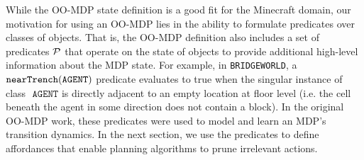 \documentclass[]{article}
\begin{document}
While the OO-MDP state definition is a good fit for the Minecraft
domain, our motivation for using an OO-MDP lies in the ability to
formulate predicates over classes of objects. That is, the OO-MDP
definition also includes a set of predicates ${\cal P}$ that operate
on the state of objects to provide additional high-level information
about the MDP state. For example, in \texttt{BRIDGEWORLD}, a ${\tt
  nearTrench}({\tt AGENT})$ predicate evaluates to true when the singular
instance of class $\texttt{ AGENT}$ is directly adjacent to an empty location
at floor level (i.e. the cell beneath the agent in some direction does not
contain a block). In the original OO-MDP work, these predicates were used
to model and learn an MDP's transition dynamics. In the next section,
we use the predicates to define affordances that enable planning
algorithms to prune irrelevant actions.




%
\end{document}
